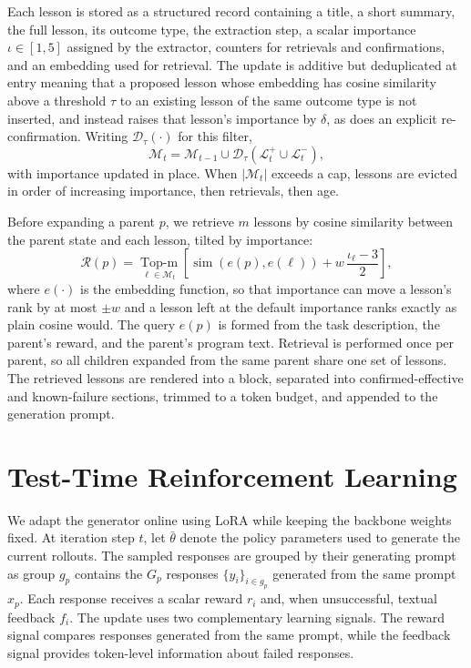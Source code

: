 \documentclass{article} %
\begin{document}
Each lesson is stored as a structured record containing a title, a short summary, the full
lesson, its outcome type, the extraction step, a scalar importance $\iota \in [1,5]$
assigned by the extractor, counters for retrievals and confirmations, and an embedding used
for retrieval. The update is additive but deduplicated at entry meaning that a proposed lesson whose
embedding has cosine similarity above a threshold $\tau$ to an existing lesson of the same
outcome type is not inserted, and instead raises that lesson's importance by
$\delta$, as does an explicit re-confirmation. Writing
$\mathcal{D}_\tau(\cdot)$ for this filter,
\begin{equation*}
\mathcal{M}_t
=
\mathcal{M}_{t-1}
\cup
\mathcal{D}_\tau\!\left(\mathcal{L}_t^{+} \cup \mathcal{L}_t^{-}\right),
\end{equation*}
with importance updated in place. When $|\mathcal{M}_t|$ exceeds a cap, lessons are evicted
in order of increasing importance, then retrievals, then age.

Before expanding a parent $p$, we retrieve $m$ lessons by cosine similarity between the
parent state and each lesson, tilted by importance:
\begin{equation}
\mathcal{R}(p)
=
\operatorname*{Top\text{-}m}_{\ell\in\mathcal{M}_t}
\left[
\operatorname{sim}\!\left(e(p),e(\ell)\right)
+
w\,\frac{\iota_\ell - 3}{2}
\right],
\label{eq:memory-retrieval}
\end{equation}
where $e(\cdot)$ is the embedding function, so that importance can move a lesson's rank by
at most $\pm w$ and a lesson left at the default importance ranks exactly as plain cosine
would. The query $e(p)$ is formed from the task description, the parent's reward, and the
parent's program text. Retrieval is performed once per parent, so all children expanded
from the same parent share one set of lessons. The retrieved lessons are rendered into a
block, separated into confirmed-effective and known-failure sections, trimmed to a token
budget, and appended to the generation prompt. 



\section{Test-Time Reinforcement Learning}
\label{sec:test-time-rl}

We adapt the generator online using LoRA while keeping the backbone weights
fixed. At iteration step $t$, let $\bar{\theta}$ denote the policy parameters
used to generate the current rollouts. The sampled responses are grouped by
their generating prompt as group $g_p$ contains the $G_p$ responses
$\{y_i\}_{i\in g_p}$ generated from the same prompt $x_p$. Each response
receives a scalar reward $r_i$ and, when unsuccessful, textual feedback $f_i$.
The update uses two complementary learning signals. The reward signal compares
responses generated from the same prompt, while the feedback signal provides
token-level information about failed responses.
\end{document}
